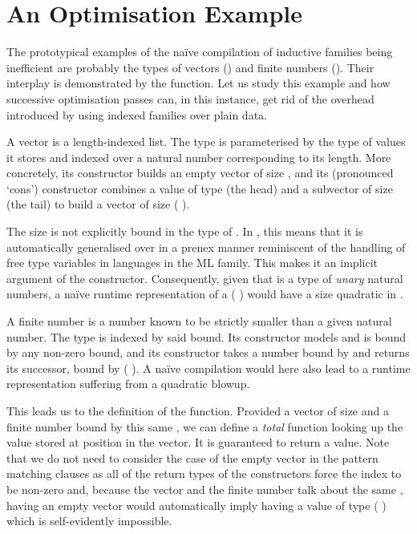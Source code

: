 
\section{An Optimisation Example}\label{sec:optimisation-example}

The prototypical examples of the naïve compilation of inductive families being
inefficient are probably the types of vectors ()
and finite numbers ().
%
Their interplay is demonstrated by the  function.
Let us study this example and how successive optimisation passes can, in this
instance, get rid of the overhead introduced by using indexed families over
plain data.

A vector is a length-indexed list. The type  is parameterised
by the type of values it stores and indexed over a natural number corresponding
to its length.
%
More concretely, its  constructor builds an empty vector of size
, and its \IdrisData{(::)} (pronounced `cons') constructor combines a
value of type  (the head) and a subvector of size 
(the tail) to build a vector of size ( \IdrisFunction{+} ).


The size  is not explicitly bound in the type of \IdrisData{(::)}.
In \idris{}, this means that it is automatically generalised over in a prenex
manner reminiscent of the handling of free type variables in languages in the
ML family.
%
This makes it an implicit argument of the constructor. Consequently, given that
 is a type of \emph{unary} natural numbers, a naïve runtime
representation of a {(  )} would
have a size quadratic in .

A finite number is a number known to be strictly smaller than a given natural
number. The type  is indexed by said bound.
%
Its  constructor models  and is bound by any
non-zero bound, and its  constructor takes a number bound by
 and returns its successor, bound by
( \IdrisFunction{+} ).
%
A naïve compilation would here also lead to a runtime representation suffering
from a quadratic blowup.


This leads us to the definition of the  function.
%
Provided a vector of size  and a finite number  bound
by this same , we can define a \emph{total} function looking up the
value stored at position  in the vector.
%
It is guaranteed to return a value.
%
Note that we do not need to consider the case of the empty vector in the pattern
matching clauses as all of the return types of the  constructors force
the index to be non-zero and, because the vector and the finite number talk about the
same , having an empty vector would automatically imply having a value
of type ( ) which is self-evidently impossible.


